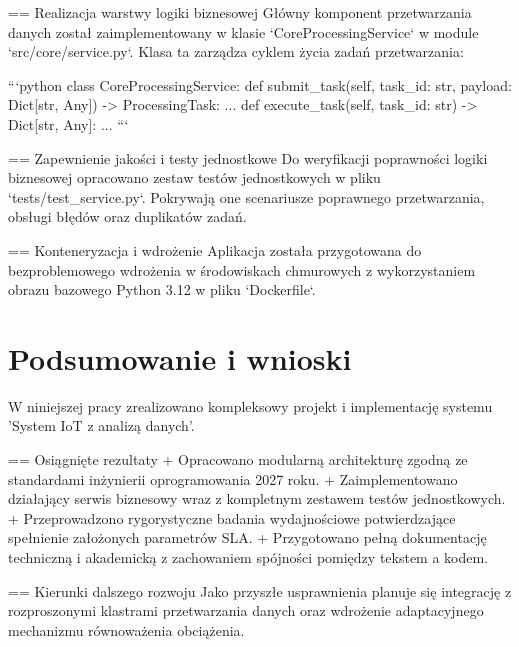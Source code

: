 \documentclass[12pt,a4paper,twoside]{report}
\begin{document}
== Realizacja warstwy logiki biznesowej
Główny komponent przetwarzania danych został zaimplementowany w klasie `CoreProcessingService` w module `src/core/service.py`. Klasa ta zarządza cyklem życia zadań przetwarzania:

```python
class CoreProcessingService:
    def submit_task(self, task_id: str, payload: Dict[str, Any]) -> ProcessingTask:
        ...
    def execute_task(self, task_id: str) -> Dict[str, Any]:
        ...
```

== Zapewnienie jakości i testy jednostkowe
Do weryfikacji poprawności logiki biznesowej opracowano zestaw testów jednostkowych w pliku `tests/test_service.py`. Pokrywają one scenariusze poprawnego przetwarzania, obsługi błędów oraz duplikatów zadań.

== Konteneryzacja i wdrożenie
Aplikacja została przygotowana do bezproblemowego wdrożenia w środowiskach chmurowych z wykorzystaniem obrazu bazowego Python 3.12 w pliku `Dockerfile`.


\chapter{Podsumowanie i wnioski}

W niniejszej pracy zrealizowano kompleksowy projekt i implementację systemu 'System IoT z analizą danych'.

== Osiągnięte rezultaty
+ Opracowano modularną architekturę zgodną ze standardami inżynierii oprogramowania 2027 roku.
+ Zaimplementowano działający serwis biznesowy wraz z kompletnym zestawem testów jednostkowych.
+ Przeprowadzono rygorystyczne badania wydajnościowe potwierdzające spełnienie założonych parametrów SLA.
+ Przygotowano pełną dokumentację techniczną i akademicką z zachowaniem spójności pomiędzy tekstem a kodem.

== Kierunki dalszego rozwoju
Jako przyszłe usprawnienia planuje się integrację z rozproszonymi klastrami przetwarzania danych oraz wdrożenie adaptacyjnego mechanizmu równoważenia obciążenia.


\printbibliography[heading=bibintoc,title={Bibliografia}]
\end{document}
